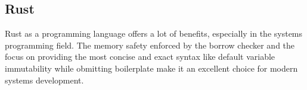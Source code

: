 \subsection{Rust}
Rust as a programming language offers a lot of benefits, especially in the systems programming field. The memory safety enforced by the borrow checker and the focus on providing the most concise and exact syntax like default variable immutability while obmitting boilerplate make it an excellent choice for modern systems development.